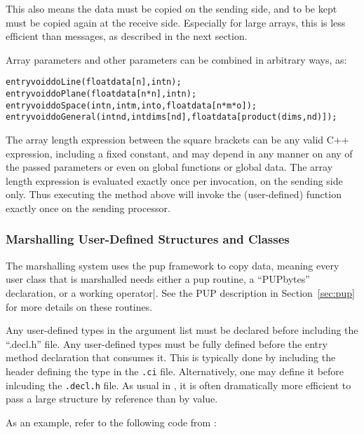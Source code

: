 This also means the data must be copied on the sending 
side, and to be kept must be copied again 
at the receive side.  Especially for large arrays, this 
is less efficient than messages, as described in the next section.

Array parameters and other parameters can be combined in arbitrary ways, as:
\begin{alltt}
  entry void doLine(float data[n],int n);
  entry void doPlane(float data[n*n],int n);
  entry void doSpace(int n,int m,int o,float data[n*m*o]);
  entry void doGeneral(int nd,int dims[nd],float data[product(dims,nd)]);
\end{alltt}
The array length expression between the square brackets can be 
any valid C++ expression, including a fixed constant, and may depend 
in any manner on any of the passed
parameters or even on global functions or global data.  The array length 
expression is evaluated exactly once per invocation, on the sending side only.
Thus executing the  method above will invoke the 
(user-defined)  function exactly once on the sending
processor.

\subsubsection{Marshalling User-Defined Structures and Classes}

The marshalling system uses the pup framework to copy data,
meaning every user class that is marshalled needs either a
pup routine, a ``PUPbytes'' declaration, or a working operator|.
See the PUP description in Section~\ref{sec:pup} for more details 
on these routines.

Any user-defined types in the argument list must be declared 
before including the ``.decl.h'' file.
Any user-defined types must be fully defined before the entry
method declaration that consumes it.  This is typically done by
including the header defining the type in the {\tt .ci} file.
Alternatively, one may define it before inlcuding the
{\tt .decl.h} file.  As usual in \CC, it is often dramatically
 more efficient to pass a large structure by reference than by value.

As an example, refer to the following code from :

